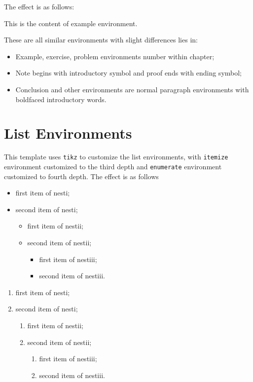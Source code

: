 \documentclass[11pt]{elegantbook}
\begin{document}
The effect is as follows:

\begin{example}
This is the content of example environment.
\end{example}

These are all similar environments with slight differences lies in:

\begin{itemize}
   \item Example, exercise, problem environments number within chapter;
   \item Note begins with introductory symbol and proof ends with ending symbol;
   \item Conclusion and other environments are normal paragraph environments with boldfaced introductory words.
\end{itemize}


\section{List Environments}
This template uses \lstinline{tikz} to customize the list environments, with \lstinline{itemize} environment customized to the third depth and \lstinline{enumerate} environment customized to fourth depth. The effect is as follows\\[2ex]
\begin{minipage}[b]{0.49\textwidth}
\begin{itemize}
   \item first item of nesti;
   \item second item of nesti;
   \begin{itemize}
      \item first item of nestii;
      \item second item of nestii;
      \begin{itemize}
         \item first item of nestiii;
         \item second item of nestiii.
      \end{itemize}   
   \end{itemize}
\end{itemize}
\end{minipage}
\begin{minipage}[b]{0.49\textwidth}
\begin{enumerate}
   \item first item of nesti;
   \item second item of nesti;
   \begin{enumerate}
      \item first item of nestii;
      \item second item of nestii;
      \begin{enumerate}
         \item first item of nestiii;
         \item second item of nestiii.
      \end{enumerate}   
   \end{enumerate}
\end{enumerate}
\end{minipage}
\end{document}
